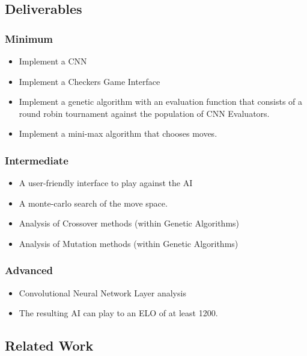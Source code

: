 \documentclass[12pt,a4paper]{article}
\begin{document}
\subsection*{Deliverables}

    \subsubsection*{Minimum}

    \begin{itemize}
    \item Implement a CNN
    \item Implement a Checkers Game Interface
    \item Implement a genetic algorithm with an evaluation function that
    consists of a round robin tournament against the population of CNN
    Evaluators.
    \item Implement a mini-max algorithm that chooses moves.
    \end{itemize}

    \subsubsection*{Intermediate}

    \begin{itemize}
    \item A user-friendly interface to play against the AI
    \item A monte-carlo search of the move space.
    \item Analysis of Crossover methods (within Genetic Algorithms)
    \item Analysis of Mutation methods (within Genetic Algorithms)
    \end{itemize}

    \subsubsection*{Advanced}

    \begin{itemize}
    \item Convolutional Neural Network Layer analysis
    \item The resulting AI can play to an ELO of at least 1200.
    \end{itemize}

\subsection*{Related Work}
\end{document}
